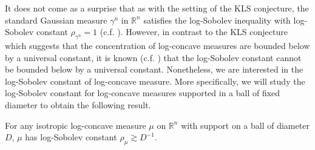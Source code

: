 It does not come as a surprise that as with the setting of the KLS conjecture, the standard Gaussian measure 
\(\gamma^n\) in \(\mathbb{R}^n\) satisfies the log-Sobolev inequality with log-Sobolev constant 
\(\rho_{\gamma^n} = 1\) (c.f. \cite{Gross_1975}). However, in contrast to the KLS conjecture which suggests that the concentration of 
log-concave measures are bounded below by a universal constant, it is known (c.f. \cite{Lee_2016}) that the log-Sobolev constant 
cannot be bounded below by a universal constant. Nonetheless, we are 
interested in the log-Sobolev constant of log-concave measure. More specifically, we will study the 
log-Sobolev constant for log-concave measures supported in a ball of fixed diameter to obtain the 
following result.

\begin{theorem}\label{thm:Lee_Vempala}
  For any isotropic log-concave measure \(\mu\) on \(\mathbb{R}^n\) with support on a ball of diameter \(D\), 
  \(\mu\) has log-Sobolev constant \(\rho_\mu \gtrsim D^{-1}\).
\end{theorem}







